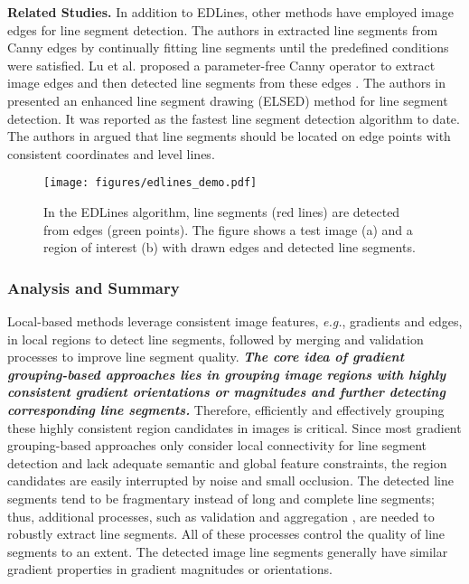 \documentclass[journal,compsoc]{IEEEtran}
\begin{document}
\textbf{Related Studies.} In addition to EDLines, other methods have employed image edges for line segment detection. The authors in \cite{Outdoorplacerecognitioninurbanenvironmentsusingstraightlines} extracted line segments from Canny edges by continually fitting line segments until the predefined conditions were satisfied. Lu et al. proposed a parameter-free Canny operator to extract image edges and then detected line segments from these edges \cite{CannyLines}. The authors in \cite{ELSED} presented an enhanced line segment drawing (ELSED) method for line segment detection. It was reported as the fastest line segment detection algorithm to date. The authors in \cite{E2LSD} argued that line segments should be located on edge points with consistent coordinates and level lines.

\begin{figure}[tbp]
	\centering
	\texttt{[image: figures/edlines\_demo.pdf]}
	\caption{In the EDLines \cite{EDLines} algorithm, line segments (red lines) are detected from edges (green points). The figure shows a test image (a) and a region of interest (b) with drawn edges and detected line segments.}
	\label{edlines}
\end{figure}


\subsubsection{Analysis and Summary}
Local-based methods leverage consistent image features, \textit{e.g.}, gradients and edges, in local regions to detect line segments, followed by merging and validation processes to improve line segment quality. \textbf{\textit{The core idea of gradient grouping-based approaches lies in grouping image regions with highly consistent gradient orientations or magnitudes and further detecting corresponding line segments.}} Therefore, efficiently and effectively grouping these highly consistent region candidates in images is critical. Since most gradient grouping-based approaches only consider local connectivity for line segment detection and lack adequate semantic and global feature constraints, the region candidates are easily interrupted by noise and small occlusion. The detected line segments tend to be fragmentary instead of long and complete line segments; thus, additional processes, such as validation \cite{LSDaLineSegmentDetector} and aggregation \cite{ANovelLineletBasedRepresentationforLineSegmentDetection,Ametricforlinesegments}, are needed to robustly extract line segments. All of these processes control the quality of line segments to an extent. The detected image line segments generally have similar gradient properties in gradient magnitudes or orientations.
\end{document}
